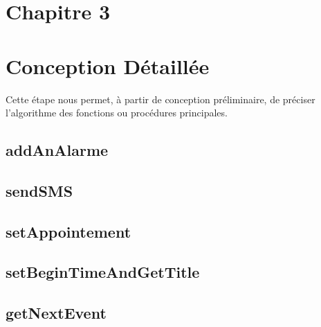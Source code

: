 \section*{Chapitre 3}
\section{Conception Détaillée}
\indent Cette étape nous permet, à partir de conception préliminaire, de préciser l'algorithme des fonctions ou procédures principales.

\subsection{addAnAlarme}
	

\subsection{sendSMS}
	

\subsection{setAppointement}
	

\subsection{setBeginTimeAndGetTitle}
	
	
\subsection{getNextEvent}
	